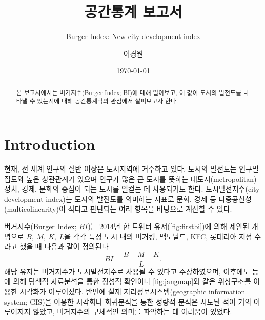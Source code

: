 \documentclass{scrartcl}
\begin{document}
\title{공간통계 보고서}
\subtitle{Burger Index: New city development index}
\author{이경원}
\date{\today}
\maketitle


\begin{abstract}
    본 보고서에서는 버거지수(Burger Index; BI)에 대해 알아보고, 이 값이 도시의 발전도를 나타낼 수 있는지에 대해 공간통계학의 관점에서 살펴보고자 한다. 
\end{abstract}

\section{Introduction}   

현재, 전 세계 인구의 절반 이상은 도시지역에 거주하고 있다. 도시의 발전도는 인구밀집도와 높은 상관관계가 있으며 인구가 많은 큰 도시를 뜻하는 대도시(metropolitan)\가 정치, 경제, 문화의 중심이 되는 도시를 일컫는 데 사용되기도 한다. 도시발전지수(city development index)는 도시의 발전도를 의미하는 지표로 문화, 경제 등 다중공산성(multicolinearity)이 적다고 판단되는 여러 항목을 바탕으로 계산할 수 있다. 

버거지수(Burger Index; $BI$)는 2014년 한 트위터 유저(\autoref{fig:firstbi})에 의해 제안된 개념으로 $B,~M,~K,~L$을 각각 특정 도시 내의 버거킹, 맥도날드, KFC, 롯데리아 지점 수라고 했을 때 다음과 같이 정의된다
\begin{equation}\label{eqn:originbi}
    BI = \frac{B+M+K}{L}.
\end{equation}
해당 유저는 버거지수가 도시발전지수로 사용될 수 있다고 주장하였으며, 이후에도 \citet{jang2014} 등에 의해 탐색적 자료분석을 통한 정성적 확인이나 \autoref{fig:jangmap}와 같은 위상구조를 이용한 시각화가 이루어졌다. 반면에 실제 지리정보시스템(geographic information system; GIS)을 이용한 시각화나 회귀분석을 통한 정량적 분석은 시도된 적이 거의 이루어지지 않았고, 버거지수의 구체적인 의미를 파악하는 데 어려움이 있었다.
\end{document}
